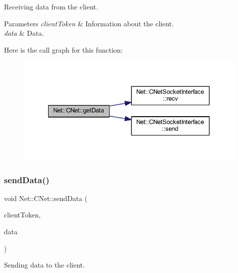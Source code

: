 Receiving data from the client. 


\begin{DoxyParams}{Parameters}
{\em client\+Token} & Information about the client. \\
\hline
{\em data} & Data. \\
\hline
\end{DoxyParams}
Here is the call graph for this function\+:
\nopagebreak
\begin{figure}[H]
\begin{center}
\leavevmode
\includegraphics[width=342pt]{class_net_1_1_c_net_a77d474d293656443de888283db8a74f0_cgraph}
\end{center}
\end{figure}
\mbox{\label{class_net_1_1_c_net_a22a961e8db355efd94539336937b956b}} 
\subsubsection{\texorpdfstring{send\+Data()}{sendData()}}
{\footnotesize\ttfamily void Net\+::\+C\+Net\+::send\+Data (\begin{DoxyParamCaption}\item[{const \mbox{\hyperlink{struct_net_1_1_s_token}{S\+Token}} \&}]{client\+Token,  }\item[{const std\+::string \&}]{data }\end{DoxyParamCaption})}



Sending data to the client. 


